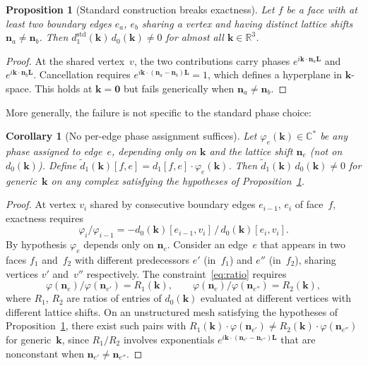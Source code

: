 \documentclass[preprint,12pt]{elsarticle}
\newtheorem{proposition}{Proposition}
\newtheorem{corollary}{Corollary}
\begin{document}
\begin{proposition}[Standard construction breaks exactness]\label{prop:break}
Let $f$ be a face with at least two boundary edges $e_a$, $e_b$ sharing a vertex and having distinct lattice shifts $\mathbf{n}_a \neq \mathbf{n}_b$. Then $d_1^{\mathrm{std}}(\mathbf{k})\,d_0(\mathbf{k}) \neq 0$ for almost all $\mathbf{k} \in \mathbb{R}^3$.
\end{proposition}

\begin{proof}
At the shared vertex~$v$, the two contributions carry phases $e^{i\mathbf{k}\cdot\mathbf{n}_a\mathbf{L}}$ and $e^{i\mathbf{k}\cdot\mathbf{n}_b\mathbf{L}}$. Cancellation requires $e^{i\mathbf{k}\cdot(\mathbf{n}_a - \mathbf{n}_b)\mathbf{L}} = 1$, which defines a hyperplane in $\mathbf{k}$-space. This holds at $\mathbf{k} = \mathbf{0}$ but fails generically when $\mathbf{n}_a \neq \mathbf{n}_b$.
\end{proof}

More generally, the failure is not specific to the standard phase choice:

\begin{corollary}[No per-edge phase assignment suffices]\label{cor:noedge}
Let $\varphi_e(\mathbf{k}) \in \mathbb{C}^*$ be any phase assigned to edge~$e$, depending only on $\mathbf{k}$ and the lattice shift $\mathbf{n}_e$ (not on $d_0(\mathbf{k})$). Define $\tilde{d}_1(\mathbf{k})[f,e] = d_1[f,e]\cdot\varphi_e(\mathbf{k})$. Then $\tilde{d}_1(\mathbf{k})\,d_0(\mathbf{k}) \neq 0$ for generic~$\mathbf{k}$ on any complex satisfying the hypotheses of Proposition~\ref{prop:break}.
\end{corollary}

\begin{proof}
At vertex $v_i$ shared by consecutive boundary edges $e_{i-1}$, $e_i$ of face~$f$, exactness requires
\begin{equation}\label{eq:ratio}
\varphi_i / \varphi_{i-1} = -d_0(\mathbf{k})[e_{i-1}, v_i]\,/\,d_0(\mathbf{k})[e_i, v_i].
\end{equation}
By hypothesis $\varphi_e$ depends only on $\mathbf{n}_e$. Consider an edge~$e$ that appears in two faces $f_1$ and~$f_2$ with different predecessors $e'$ (in~$f_1$) and $e''$ (in~$f_2$), sharing vertices $v'$ and~$v''$ respectively. The constraint~\eqref{eq:ratio} requires
\[
  \varphi(\mathbf{n}_e) / \varphi(\mathbf{n}_{e'}) = R_1(\mathbf{k}), \qquad
  \varphi(\mathbf{n}_e) / \varphi(\mathbf{n}_{e''}) = R_2(\mathbf{k}),
\]
where $R_1$, $R_2$ are ratios of entries of $d_0(\mathbf{k})$ evaluated at different vertices with different lattice shifts. On an unstructured mesh satisfying the hypotheses of Proposition~\ref{prop:break}, there exist such pairs with $R_1(\mathbf{k}) \cdot \varphi(\mathbf{n}_{e'}) \neq R_2(\mathbf{k}) \cdot \varphi(\mathbf{n}_{e''})$ for generic~$\mathbf{k}$, since $R_1/R_2$ involves exponentials $e^{i\mathbf{k}\cdot(\mathbf{n}_{e'} - \mathbf{n}_{e''})\mathbf{L}}$ that are nonconstant when $\mathbf{n}_{e'} \neq \mathbf{n}_{e''}$.
\end{proof}
\end{document}
